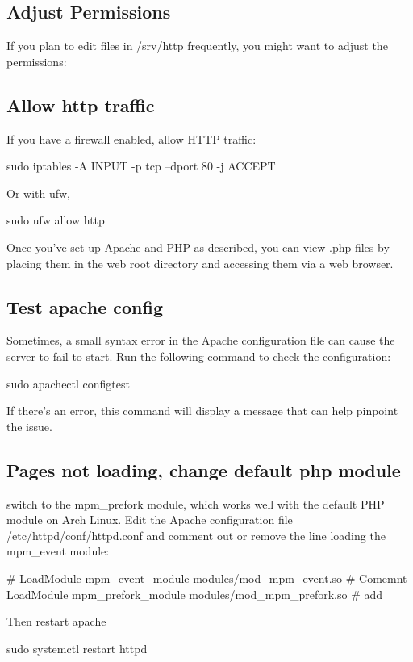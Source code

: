 \documentclass{report}
\begin{document}
    \subsection{Adjust Permissions}
    \bigbreak \noindent 
    If you plan to edit files in /srv/http frequently, you might want to adjust the permissions:
    \bigbreak \noindent 
    \bigbreak \noindent 
    \subsection{Allow http traffic}
    \bigbreak \noindent 
    If you have a firewall enabled, allow HTTP traffic:
    \bigbreak \noindent 
    \begin{bashcode}
       sudo iptables -A INPUT -p tcp --dport 80 -j ACCEPT
    \end{bashcode}
    \bigbreak \noindent 
    Or with ufw,
    \begin{bashcode}
    sudo ufw allow http
    \end{bashcode}
    \bigbreak \noindent 
    Once you’ve set up Apache and PHP as described, you can view .php files by placing them in the web root directory and accessing them via a web browser. 
    \bigbreak \noindent 
    \subsection{Test apache config}
    \bigbreak \noindent 
    Sometimes, a small syntax error in the Apache configuration file can cause the server to fail to start. Run the following command to check the configuration:
    \bigbreak \noindent 
    \begin{bashcode}
    sudo apachectl configtest
    \end{bashcode}
    \bigbreak \noindent 
    If there’s an error, this command will display a message that can help pinpoint the issue.

    \bigbreak \noindent 
    \subsection{Pages not loading, change default php module}
    \bigbreak \noindent 
    switch to the mpm\_prefork module, which works well with the default PHP module on Arch Linux.
    \bigbreak \noindent 
    Edit the Apache configuration file /etc/httpd/conf/httpd.conf and comment out or remove the line loading the mpm\_event module:
    \bigbreak \noindent 
    \begin{bashcode}
    # LoadModule mpm_event_module modules/mod_mpm_event.so      # Comemnt
    LoadModule mpm_prefork_module modules/mod_mpm_prefork.so    # add
    \end{bashcode}
    \bigbreak \noindent 
    Then restart apache
    \bigbreak \noindent 
    \begin{bashcode}
    sudo systemctl restart httpd
    \end{bashcode}
\end{document}
